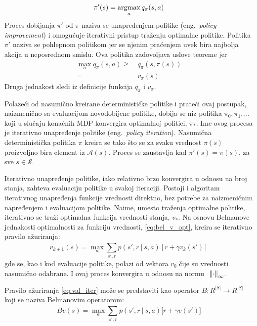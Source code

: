 \begin{equation}
	\pi'(s) = \operatorname*{\arg\!\max}_a q_{\pi}(s, a)
\end{equation}
Proces dobijanja $\pi'$ od $\pi$  naziva se unapređenjem politike (eng.~{\em policy improvement}) i omogućuje iterativni pristup traženju optimalne politike. Politika $\pi'$ naziva se pohlepnom politikom jer se njenim praćenjem uvek bira najbolja akcija u neposrednom smislu. Ova politika zadovoljava uslove teoreme jer
\begin{align}
	\max_a q_{\pi}(s,a) \geq&~ q_{\pi}(s,\pi(s)) \\=&~v_{\pi}(s)
\end{align}
Druga jednakost sledi iz definicije funkcija $q_{\pi}$ i $v_{\pi}$.
\par 
Polazeći od nasumično kreirane determinističke politike i prateći ovaj postupak, naizmenično sa evaluacijom novodobijene politike, dobija se niz politika $\pi_0, \pi_1, ...$ koji u slučaju konačnih MDP konvergira optimalnoj politici, $\pi_*$. Ime ovog procesa je iterativno unapređenje politike (eng.~{\em policy iteration}). Nasumična deterministička politika $\pi$ kreira se tako što se za svaku vrednost $\pi(s)$ proizvoljno bira element iz $\mathcal{A}(s)$. Proces se zaustavlja kad $\pi'(s) = \pi(s)$, za sve $s \in \mathcal{S}$.
\par 
Iterativno unapređenje politike, iako relativno brzo konvergira u odnosu na broj stanja, zahteva evaluaciju politike u svakoj iteraciji. Postoji i algoritam iterativnog unapređenja funkcije vrednosti direktno, bez potrebe za naizmeničnim napređenjem i evaluacijom politike. Naime, umesto traženja optimalne politike, iterativno se traži optimalna funkcija vrednosti stanja, $v_*$. Na osnovu Belmanove jednakosti optimalnosti za funkciju vrednosti, \eqref{eq:bel_v_opt}, kreira se iterativno pravilo ažuriranja:
\begin{equation}
	\label{eq:val_iter} v_{k+1}(s) = \max_{a}\sum_{s', r}^{} p(s', r~|~s,a)[r+\gamma v_k(s')]
\end{equation}
gde se, kao i kod evaluacije politike, polazi od vektora $v_0$ čije su vrednosti nasumično odabrane. I ovaj proces konvergira u odnosu na normu ~$\norm{\cdot}_{\infty}$.
\par 
Pravilo ažuriranja \eqref{eq:val_iter} može se predstaviti kao operator $B:R^{|S|} \rightarrow R^{|S|}$ koji se naziva Belmanovim operatorom:
\begin{equation}
	Bv(s) = \max_{a}\sum_{s', r}^{} p(s', r~|~s,a)\big[r + \gamma v(s')\big]
\end{equation}
